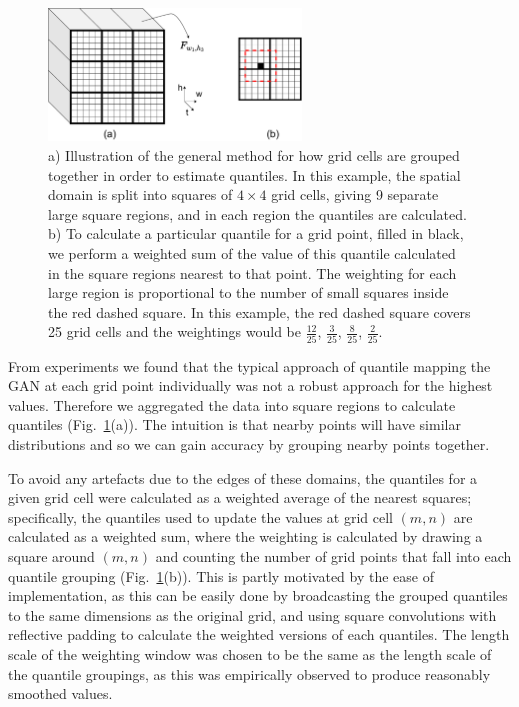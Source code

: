 \documentclass{article}
\begin{document}
\begin{figure}

    \centering

        \includegraphics[width=0.6\textwidth]{images/quantile_mapping.drawio.pdf}
      \caption{a) Illustration of the general method for how grid cells are grouped together in order to estimate quantiles. In this example, the spatial domain is split into squares of $4 \times 4$ grid cells, giving 9 separate large square regions, and in each region the quantiles are calculated. b) To calculate a particular quantile for a grid point, filled in black, we perform a weighted sum of the value of this quantile calculated in the square regions nearest to that point. The weighting for each large region is proportional to the number of small squares inside the red dashed square. In this example, the red dashed square covers 25 grid cells and the weightings would be $\frac{12}{25}$, $\frac{3}{25}$, $\frac{8}{25}$, $\frac{2}{25}$.}
     \label{fig:quantiles}
\end{figure}    

From experiments we found that the typical approach of quantile mapping the GAN at each grid point individually was not a robust approach for the highest values. Therefore we aggregated the data into square regions to calculate quantiles (Fig.~\ref{fig:quantiles}(a)). The intuition is that nearby points will have similar distributions and so we can gain accuracy by grouping nearby points together. 

To avoid any artefacts due to the edges of these domains, the quantiles for a given grid cell were calculated as a weighted average of the nearest squares; specifically, the quantiles used to update the values at grid cell $(m,n)$ are calculated as a weighted sum, where the weighting is calculated by drawing a square around $(m,n)$ and counting the number of grid points that fall into each quantile grouping (Fig.~\ref{fig:quantiles}(b)). This is partly motivated by the ease of implementation, as this can be easily done by broadcasting the grouped quantiles to the same dimensions as the original grid, and using square convolutions with reflective padding to calculate the weighted versions of each quantiles. The length scale of the weighting window was chosen to be the same as the length scale of the quantile groupings, as this was empirically observed to produce reasonably smoothed values.
\end{document}
